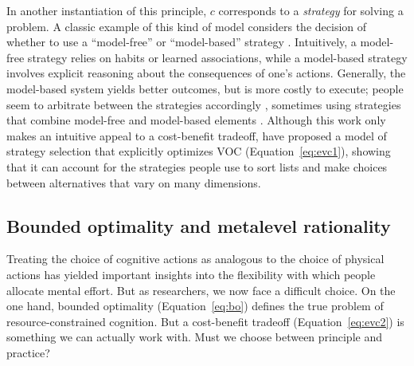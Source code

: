 
In another instantiation of this principle, $c$ corresponds to a \emph{strategy} for solving a problem. A classic example of this kind of model considers the decision of whether to use a ``model-free'' or ``model-based'' strategy \citep{daw2005uncertaintybased}. Intuitively, a model-free strategy relies on habits or learned associations, while a model-based strategy involves explicit reasoning about the consequences of one's actions. Generally, the model-based system yields better outcomes, but is more costly to execute; people seem to arbitrate between the strategies accordingly \citep{keramati2011speed,kool2017costbenefit}, sometimes using strategies that combine model-free and model-based elements \citep{keramati2016adaptive}. Although this work only makes an intuitive appeal to a cost-benefit tradeoff, \citet{lieder2017strategy} have proposed a model of strategy selection that explicitly optimizes VOC (Equation~\ref{eq:evc1}), showing that it can account for the strategies people use to sort lists and make choices between alternatives that vary on many dimensions.

\subsection{Bounded optimality and metalevel rationality}\label{sec:bound-meta}

Treating the choice of cognitive actions as analogous to the choice of physical actions has yielded important insights into the flexibility with which people allocate mental effort. But as researchers, we now face a difficult choice. On the one hand, bounded optimality (Equation~\ref{eq:bo}) defines the true problem of resource-constrained cognition. But a cost-benefit tradeoff (Equation~\ref{eq:evc2}) is something we can actually work with. Must we choose between principle and practice?

